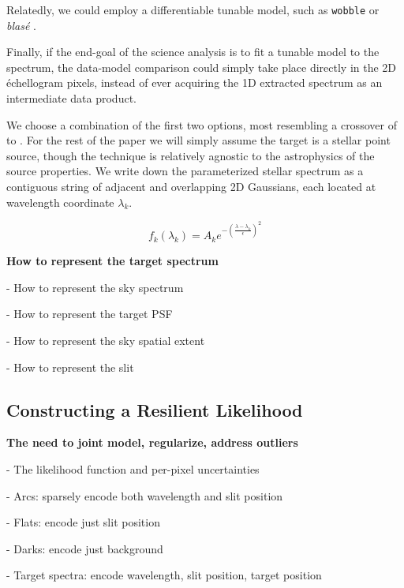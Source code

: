 \documentclass[twocolumn]{aastex631}
\begin{document}
Relatedly, we could employ a differentiable tunable model, such as \texttt{wobble} \citep{2019AJ....158..164B} or \emph{blas\'e} \citep{2022ApJ...941..200G}.

Finally, if the end-goal of the science analysis is to fit a tunable model to the spectrum, the data-model comparison could simply take place directly in the 2D \'echellogram pixels, instead of ever acquiring the 1D extracted spectrum as an intermediate data product.

We choose a combination of the first two options, most resembling a crossover of  \citet{2010PASP..122..248B} to \citet{2019AJ....158..164B}.  For the rest of the paper we will simply assume the target is a stellar point source, though the technique is relatively agnostic to the astrophysics of the source properties.  We write down the parameterized stellar spectrum as a contiguous string of adjacent and overlapping 2D Gaussians, each located at wavelength coordinate $\lambda_k$.

\begin{equation}
  f_k(\lambda_k) = A_k e^{-\left (\frac{\lambda - \lambda_k}{\epsilon} \right )^2}
\end{equation}


\begin{mdframed}
  \textbf{How to represent the target spectrum} \par
  - How to represent the sky spectrum\par
  - How to represent the target PSF\par
  - How to represent the sky spatial extent\par
  - How to represent the slit\par
\end{mdframed}


\subsection{Constructing a Resilient Likelihood}
\begin{mdframed}
  \textbf{The need to joint model, regularize, address outliers} \par
  - The likelihood function and per-pixel uncertainties\par
  - Arcs: sparsely encode both wavelength and slit position\par
  - Flats: encode just slit position\par
  - Darks: encode just background\par
  - Target spectra: encode wavelength, slit position, target position\par
  \textcolor{lightgray}{\lipsum[7]}
\end{mdframed}
\end{document}
